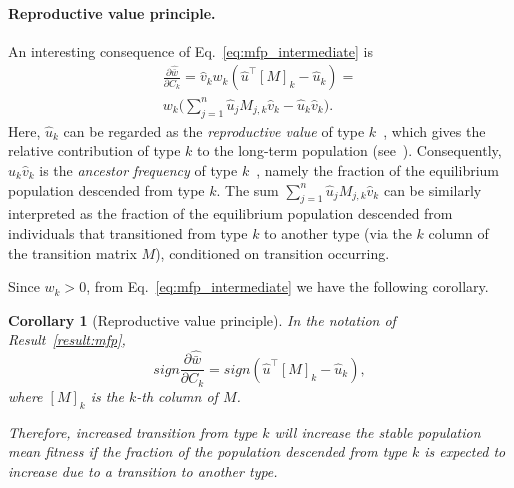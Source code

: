 \documentclass[12pt, twocolumn]{extarticle}
\newcommand*{\tr}{^\intercal}
\newtheorem{corollary}{Corollary}
\begin{document}
\paragraph*{Reproductive value principle.}

An interesting consequence of Eq.~\ref{eq:mfp_intermediate} is
\begin{equation}
\begin{aligned}
\frac{\partial \hat{\bar w}}{\partial C_k} = 
\hat v_k w_k (\hat u\tr[M]_k - \hat u_k) = \\
w_k \Big(\sum_{j=1}^{n}{\hat u_j M_{j,k} \hat v_k} - \hat u_k \hat v_k\Big).
\end{aligned}
\end{equation}
Here, $\hat u_k$ can be regarded as the \emph{reproductive value} of type $k$~\citep[pg.~27]{Fisher1930}, which gives the relative contribution of type $k$ to the long-term population (see~).
Consequently, $\hat u_k \hat v_k$ is the \emph{ancestor frequency} of type $k$~\citep{Hermisson2002}, namely the fraction of the equilibrium population descended from type $k$.
The sum $\sum_{j=1}^{n}{\hat u_j M_{j,k} \hat v_k}$ can be similarly interpreted as the fraction of the equilibrium population descended from individuals that transitioned from type $k$ to another type (via the $k$ column of the transition matrix $M$), conditioned on transition occurring.

Since $w_k>0$, from Eq.~\ref{eq:mfp_intermediate} we have the following corollary.

\begin{corollary}[Reproductive value principle]\label{cor:rvp}
In the notation of Result~\ref{result:mfp},
\begin{equation}
sign \frac{\partial \hat{\bar w}}{\partial C_k} = 
sign (\hat u\tr [M]_k - \hat u_k),
\end{equation}
where $[M]_k$ is the $k$-th column of $M$.

Therefore, increased transition from type $k$ will increase the stable population mean fitness if the fraction of the population descended from type $k$ is expected to increase due to a transition to another type. 
\end{corollary}
\end{document}
